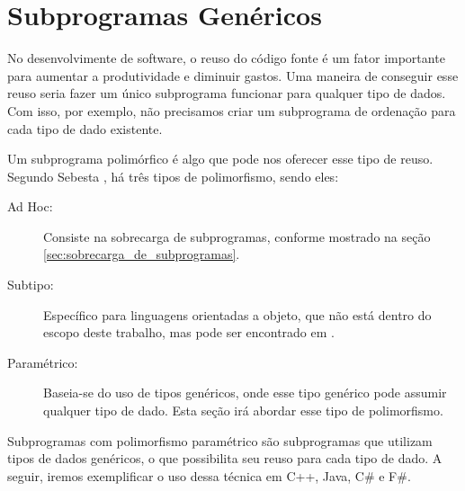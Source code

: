 \section{Subprogramas Genéricos} %
\label{sec:subprogramas_genericos}
No desenvolvimente de software, o reuso do código fonte é um fator importante para aumentar a produtividade e diminuir gastos. Uma maneira de conseguir esse reuso seria fazer um único subprograma funcionar para qualquer tipo de dados. Com isso, por exemplo, não precisamos criar um subprograma de ordenação para cada tipo de dado existente.

Um subprograma polimórfico é algo que pode nos oferecer esse tipo de reuso. Segundo Sebesta \cite{sebesta}, há três tipos de polimorfismo, sendo eles:
\begin{description}
	\item[Ad Hoc:] Consiste na sobrecarga de subprogramas, conforme mostrado na seção \ref{sec:sobrecarga_de_subprogramas}.
	\item[Subtipo:] Específico para linguagens orientadas a objeto, que não está dentro do escopo deste trabalho, mas pode ser encontrado em \cite{poli_java}.
	\item[Paramétrico:] Baseia-se do uso de tipos genéricos, onde esse tipo genérico pode assumir qualquer tipo de dado. Esta seção irá abordar esse tipo de polimorfismo.
\end{description}

Subprogramas com polimorfismo paramétrico são subprogramas que utilizam tipos de dados genéricos, o que possibilita seu reuso para cada tipo de dado. A seguir, iremos exemplificar o uso dessa técnica em C++, Java, C\# e F\#.

